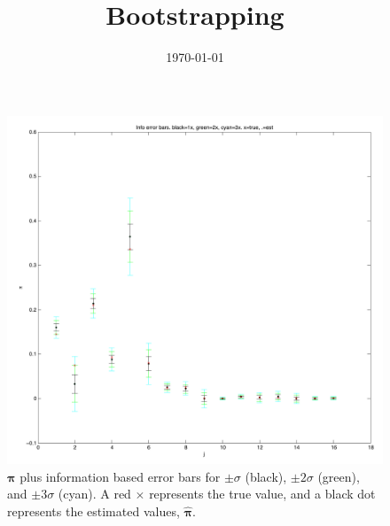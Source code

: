 \documentclass[12pt]{amsart}
\title{Bootstrapping}
\author{\today}
\newcommand{\vect}[1]{\boldsymbol{\mathbf{#1}}}
\newcommand{\vp}{\vect{\pi}}
\newcommand{\vph}{\hat{\vect{\pi}}}
\begin{document}
\maketitle







\begin{figure}
	
	\begin{center}
		\includegraphics[scale=0.6]{info_error_bars.pdf}
	\end{center}
	\caption{$\vp$ plus information based error bars for $\pm \sigma$ (black), $\pm 2\sigma$ (green), and $\pm 3\sigma$ (cyan). A red $\times$ represents the true value, and a black dot represents the estimated values, $\vph$.}
\end{figure}
\end{document}
